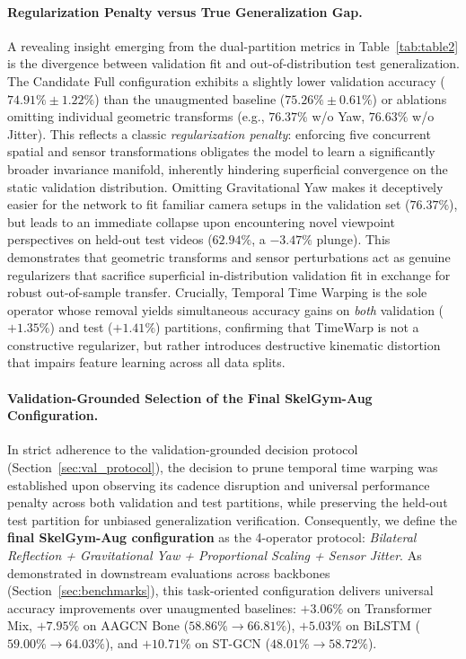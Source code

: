 \documentclass[preprint,12pt]{elsarticle}
\begin{document}
\paragraph{Regularization Penalty versus True Generalization Gap.}
A revealing insight emerging from the dual-partition metrics in Table~\ref{tab:table2} is the divergence between validation fit and out-of-distribution test generalization. The Candidate Full configuration exhibits a slightly lower validation accuracy ($74.91\% \pm 1.22\%$) than the unaugmented baseline ($75.26\% \pm 0.61\%$) or ablations omitting individual geometric transforms (e.g., $76.37\%$ w/o Yaw, $76.63\%$ w/o Jitter). This reflects a classic \textit{regularization penalty}: enforcing five concurrent spatial and sensor transformations obligates the model to learn a significantly broader invariance manifold, inherently hindering superficial convergence on the static validation distribution. Omitting Gravitational Yaw makes it deceptively easier for the network to fit familiar camera setups in the validation set ($76.37\%$), but leads to an immediate collapse upon encountering novel viewpoint perspectives on held-out test videos ($62.94\%$, a $-3.47\%$ plunge). This demonstrates that geometric transforms and sensor perturbations act as genuine regularizers that sacrifice superficial in-distribution validation fit in exchange for robust out-of-sample transfer. Crucially, Temporal Time Warping is the sole operator whose removal yields simultaneous accuracy gains on \textit{both} validation ($+1.35\%$) and test ($+1.41\%$) partitions, confirming that TimeWarp is not a constructive regularizer, but rather introduces destructive kinematic distortion that impairs feature learning across all data splits.

\paragraph{Validation-Grounded Selection of the Final SkelGym-Aug Configuration.}
In strict adherence to the validation-grounded decision protocol (Section~\ref{sec:val_protocol}), the decision to prune temporal time warping was established upon observing its cadence disruption and universal performance penalty across both validation and test partitions, while preserving the held-out test partition for unbiased generalization verification. Consequently, we define the \textbf{final SkelGym-Aug configuration} as the 4-operator protocol: \textit{Bilateral Reflection + Gravitational Yaw + Proportional Scaling + Sensor Jitter}. As demonstrated in downstream evaluations across backbones (Section~\ref{sec:benchmarks}), this task-oriented configuration delivers universal accuracy improvements over unaugmented baselines: $+3.06\%$ on Transformer Mix, $+7.95\%$ on AAGCN Bone ($58.86\% \to 66.81\%$), $+5.03\%$ on BiLSTM ($59.00\% \to 64.03\%$), and $+10.71\%$ on ST-GCN ($48.01\% \to 58.72\%$).
\end{document}
